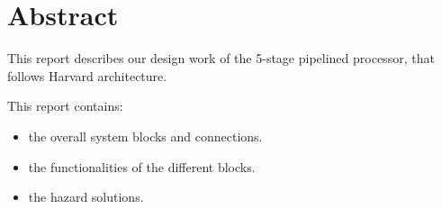 \section{Abstract}
This report describes our design work of the 5-stage pipelined processor, that follows Harvard architecture.

This report contains:
\begin{itemize}
    \item the overall system blocks and connections.
    \item the functionalities of the different blocks.
    \item the hazard solutions.
\end{itemize}